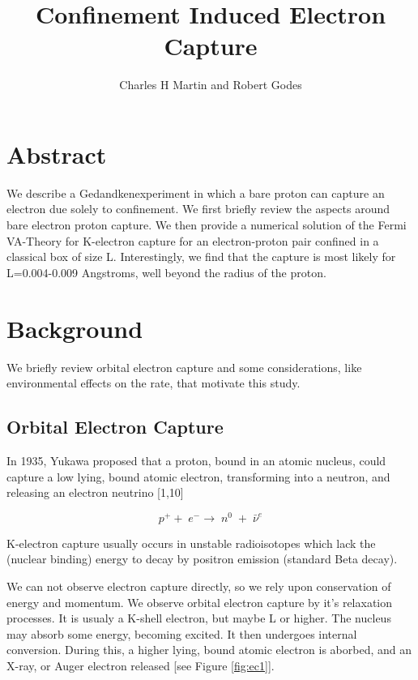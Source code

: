 \documentclass[11pt]{amsart}
\title{Confinement Induced Electron Capture}
\author{Charles H Martin and Robert Godes}
\begin{document}
\maketitle
\section{Abstract}

We describe a Gedandkenexperiment in which a bare proton can capture an electron due solely to confinement. We first briefly review the aspects around bare electron proton capture.  We then provide a numerical solution of the Fermi VA-Theory for K-electron capture for an electron-proton pair confined in a classical box of size L. Interestingly, we find that the capture is most likely for L=0.004-0.009 Angstroms, well beyond the radius of the proton. 

\section{Background}


We briefly review orbital electron capture and some considerations, like environmental effects on the rate, that motivate this study.

\subsection{Orbital Electron Capture}
In 1935, Yukawa proposed that a proton, bound in an atomic nucleus,  could capture a low lying, bound atomic electron, transforming into a neutron, and releasing an electron neutrino [1,10]


$$p^{+}+\;e^{-}\rightarrow\;n^{0}\;+\;\bar{\nu}^{e}$$

K-electron capture usually occurs in unstable radioisotopes which lack the (nuclear binding) energy to decay by positron emission (standard Beta decay).   

We can not observe electron capture directly, so we rely upon conservation of energy and momentum. We observe orbital electron capture by it's relaxation processes.  It is usualy a K-shell electron, but maybe L or higher.  The nucleus may absorb some energy, becoming excited.  It then undergoes internal conversion.  During this, a higher lying, bound atomic electron is aborbed, and an X-ray, or Auger electron released [see Figure \ref{fig:ec1}].
\end{document}

